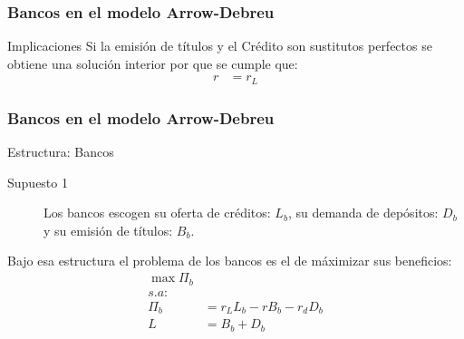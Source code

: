 \begin{frame}
    \frametitle{{\normalsize Bancos en el modelo Arrow-Debreu} {}}
    \begin{block} {Implicaciones}
        Si la emisión de títulos y el Crédito son sustitutos perfectos se obtiene una solución interior por que se cumple que:
        \begin{align}
        r&=r_{L}
        \end{align} 
     \end{block}
   
\end{frame}


\begin{frame}
    \frametitle{{\normalsize Bancos en el modelo Arrow-Debreu} {}}
    \begin{block} {Estructura: Bancos}
        \begin{description}
            \item[Supuesto 1] Los bancos escogen su oferta de créditos: $L_{b}$, su demanda de depósitos: $D_{b}$ y su emisión de títulos: $B_{b} $.
        \end{description}
        Bajo esa estructura el problema de los bancos es el de máximizar sus beneficios:
        \begin{align}
        \max \Pi_{b}\nonumber \\
        s.a:\nonumber\\
        \Pi_{b}&= r_{L}L_{b}-rB_{b}-r_{d}D_{b}\nonumber\\      
        L&=B_{b}+D_{b}\nonumber
        \end{align}
    \end{block}	
 \end{frame}


